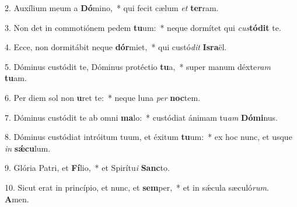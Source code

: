 2. Auxílium meum a \textbf{Dó}mino,~*  qui fecit cælum \textit{et} \textbf{ter}ram.\

3. Non det in commotiónem pedem \textbf{tu}um:~*  neque dormítet qui \textit{cus}\textbf{tó}\textbf{dit} te.\

4. Ecce, non dormitábit neque \textbf{dór}miet,~*  qui custó\textit{dit} \textbf{Is}\textbf{ra}ël.\

5. Dóminus custódit te, Dóminus protéctio \textbf{tu}a,~*  super manum déxte\textit{ram} \textbf{tu}am.\

6. Per diem sol non \textbf{u}ret te:~*  neque luna \textit{per} \textbf{noc}tem.\

7. Dóminus custódit te ab omni \textbf{ma}lo:~*  custódiat ánimam tu\textit{am} \textbf{Dó}\textbf{mi}nus.\

8. Dóminus custódiat intróitum tuum, et éxitum \textbf{tu}um:~*  ex hoc nunc, et usque \textit{in} \textbf{sǽ}\textbf{cu}lum.\

9. Glória Patri, et \textbf{Fí}lio,~*  et Spirítu\textit{i} \textbf{Sanc}to.\

10. Sicut erat in princípio, et nunc, et \textbf{sem}per,~*  et in sǽcula sæculó\textit{rum}. \textbf{A}men.\

